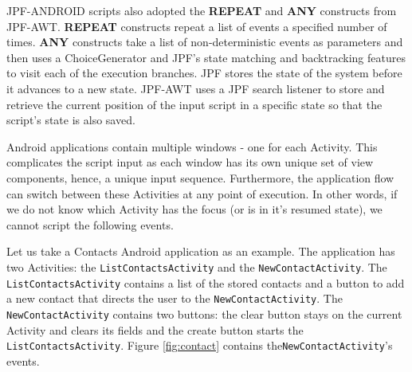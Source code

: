 \documentclass{acm_proc_article-sp}
\begin{document}
JPF-ANDROID scripts also adopted the \textbf{REPEAT} and \textbf{ANY} constructs from JPF-AWT. \textbf{REPEAT} constructs repeat a list of
events a specified number of times. \textbf{ANY} constructs take a list of non-deterministic events as parameters and then uses a ChoiceGenerator and JPF's
state matching and backtracking features to visit each of the execution branches. JPF stores the state of the system before it advances
to a new state. JPF-AWT uses a JPF search listener to store and retrieve the current position of the input script in a specific state so
that the script's state is also saved.

Android applications contain multiple windows - one for each Activity. This complicates the script input as each window has its own unique
set of view components, hence, a unique input sequence. Furthermore, the application flow can switch between these Activities
at any point of execution. In other words, if we do not know which Activity has the focus (or is in it's resumed state), we cannot script
the following events.

Let us take a Contacts Android application as an example. The application has two Activities: the \texttt{ListContactsActivity} and the
\texttt{NewContactActivity}. The \texttt{ListContactsActivity} contains a list of the stored contacts and a button to add a new contact that directs the
user to the \texttt{NewContactActivity}. The \texttt{NewContactActivity} contains two buttons: the clear button stays on the current Activity and clears its
fields and the create button starts the \texttt{ListContactsActivity}. Figure \ref{fig:contact} contains the\texttt{NewContactActivity}'s events.
\end{document}
